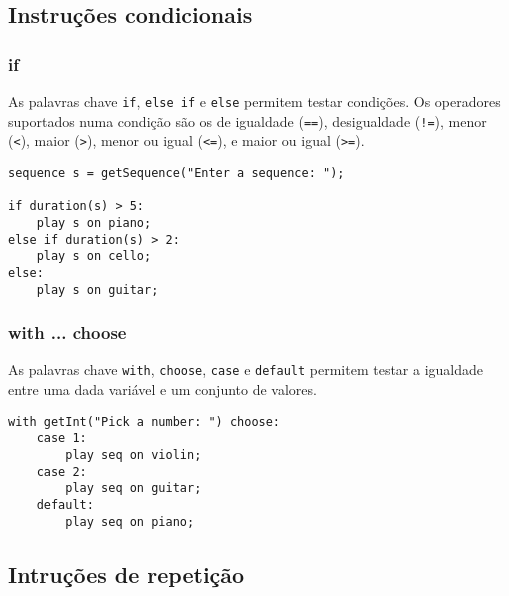 \documentclass{article}
\begin{document}
\subsection{Instruções condicionais}
\subsubsection{if}
As palavras chave \texttt{if}, \texttt{else if} e \texttt{else} permitem testar condições. Os operadores suportados numa condição são os de igualdade (\texttt{==}), desigualdade (\texttt{!=}), menor (\texttt{<}), maior (\texttt{>}), menor ou igual (\texttt{<=}), e maior ou igual (\texttt{>=}).
\begin{lstlisting} 
sequence s = getSequence("Enter a sequence: ");

if duration(s) > 5:
    play s on piano;
else if duration(s) > 2:
    play s on cello;
else:
    play s on guitar;
\end{lstlisting}

\subsubsection{with ... choose}
As palavras chave \texttt{with}, \texttt{choose}, \texttt{case} e \texttt{default} permitem testar a igualdade entre uma dada variável e um conjunto de valores. 
\begin{lstlisting} 
with getInt("Pick a number: ") choose:
    case 1:
        play seq on violin;
    case 2:
        play seq on guitar;
    default:
        play seq on piano;
\end{lstlisting}

\subsection{Intruções de repetição}
\end{document}

